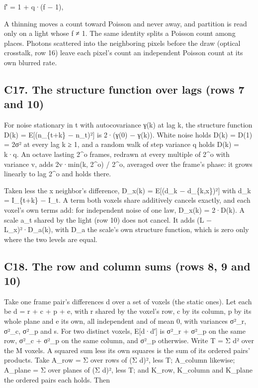 f′ = 1 + q·(f − 1),

A thinning moves a count toward Poisson and never away, and partition is read only on a light whose f ≠ 1. The same identity splits a Poisson count among places. Photons scattered into the neighboring pixels before the draw (optical crosstalk, row 16) leave each pixel's count an independent Poisson count at its own blurred rate.

\subsection{\texorpdfstring{C17. The structure function over lags (rows 7 and 10)}{C17. The structure function over lags (rows 7 and 10)}}

For noise stationary in t with autocovariance γ(k) at lag k, the structure function D(k) = E[(n\_\allowbreak{}\{t+k\} − n\_\allowbreak{}t)²] is 2·(γ(0) − γ(k)). White noise holds D(k) = D(1) = 2σ² at every lag k ≥ 1, and a random walk of step variance q holds D(k) = k·q. An octave lasting 2\textasciicircum{}o frames, redrawn at every multiple of 2\textasciicircum{}o with variance v, adds 2v·min(k, 2\textasciicircum{}o) / 2\textasciicircum{}o, averaged over the frame's phase: it grows linearly to lag 2\textasciicircum{}o and holds there.

Taken less the x neighbor's difference, D\_\allowbreak{}x(k) = E[(d\_\allowbreak{}k − d\_\allowbreak{}\{k,x\})²] with d\_\allowbreak{}k = I\_\allowbreak{}\{t+k\} − I\_\allowbreak{}t. A term both voxels share additively cancels exactly, and each voxel's own terms add: for independent noise of one law, D\_\allowbreak{}x(k) = 2·D(k). A scale a\_\allowbreak{}t shared by the light (row 10) does not cancel. It adds (L − L\_\allowbreak{}x)²·D\_\allowbreak{}a(k), with D\_\allowbreak{}a the scale's own structure function, which is zero only where the two levels are equal.

\subsection{\texorpdfstring{C18. The row and column sums (rows 8, 9 and 10)}{C18. The row and column sums (rows 8, 9 and 10)}}

Take one frame pair's differences d over a set of voxels (the static ones). Let each be d = r + c + p + e, with r shared by the voxel's row, c by its column, p by its whole plane and e its own, all independent and of mean 0, with variances σ²\_\allowbreak{}r, σ²\_\allowbreak{}c, σ²\_\allowbreak{}p and s. For two distinct voxels, E[d·d′] is σ²\_\allowbreak{}r + σ²\_\allowbreak{}p on the same row, σ²\_\allowbreak{}c + σ²\_\allowbreak{}p on the same column, and σ²\_\allowbreak{}p otherwise. Write T = Σ d² over the M voxels. A squared sum less its own squares is the sum of its ordered pairs' products. Take A\_\allowbreak{}row = Σ over rows of (Σ d)², less T; A\_\allowbreak{}column likewise; A\_\allowbreak{}plane = Σ over planes of (Σ d)², less T; and K\_\allowbreak{}row, K\_\allowbreak{}column and K\_\allowbreak{}plane the ordered pairs each holds. Then

